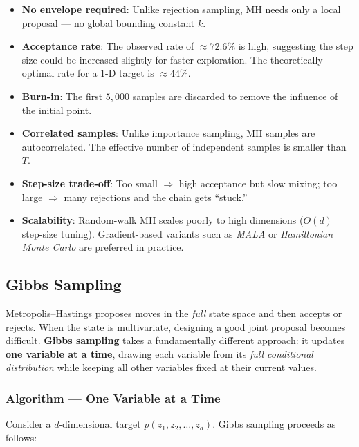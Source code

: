 \documentclass[12pt, a4paper]{article}
\begin{document}
\begin{itemize}
    \item \textbf{No envelope required}: Unlike rejection sampling,
          MH needs only a local proposal --- no global bounding
          constant $k$.
    \item \textbf{Acceptance rate}: The observed rate of
          $\approx 72.6\%$ is high, suggesting the step size could
          be increased slightly for faster exploration.  The
          theoretically optimal rate for a 1-D target is
          $\approx 44\%$.
    \item \textbf{Burn-in}: The first $5{,}000$ samples are
          discarded to remove the influence of the initial point.
    \item \textbf{Correlated samples}: Unlike importance sampling,
          MH samples are autocorrelated.  The effective number of
          independent samples is smaller than $T$.
    \item \textbf{Step-size trade-off}: Too small $\Rightarrow$
          high acceptance but slow mixing; too large $\Rightarrow$
          many rejections and the chain gets ``stuck.''
    \item \textbf{Scalability}: Random-walk MH scales
          poorly to high dimensions ($O(d)$ step-size tuning).
          Gradient-based variants such as \emph{MALA} or
          \emph{Hamiltonian Monte Carlo} are preferred in
          practice.
\end{itemize}

\subsection{Gibbs Sampling}
\label{sec:gibbs}

Metropolis--Hastings proposes moves in the \emph{full} state space
and then accepts or rejects.  When the state is multivariate,
designing a good joint proposal becomes difficult.
\textbf{Gibbs sampling} takes a fundamentally different approach:
it updates \textbf{one variable at a time}, drawing each variable
from its \emph{full conditional distribution} while keeping all
other variables fixed at their current values.

\subsubsection{Algorithm --- One Variable at a Time}

Consider a $d$-dimensional target
$p(z_1, z_2, \ldots, z_d)$.  Gibbs sampling proceeds as follows:
\end{document}
